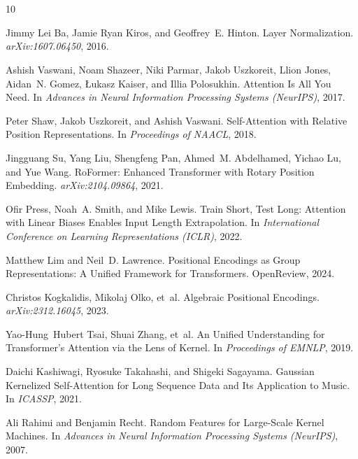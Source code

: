 \documentclass[11pt]{article}
\theoremstyle{definition}
\begin{document}
\section*{}
\begin{thebibliography}{10}

Jimmy Lei Ba, Jamie Ryan Kiros, and Geoffrey~E. Hinton.
\newblock Layer Normalization.
\newblock \emph{arXiv:1607.06450}, 2016.

Ashish Vaswani, Noam Shazeer, Niki Parmar, Jakob Uszkoreit, Llion Jones,
  Aidan~N. Gomez, {\L}ukasz Kaiser, and Illia Polosukhin.
\newblock Attention Is All You Need.
\newblock In \emph{Advances in Neural Information Processing Systems (NeurIPS)},
  2017.

Peter Shaw, Jakob Uszkoreit, and Ashish Vaswani.
\newblock Self-Attention with Relative Position Representations.
\newblock In \emph{Proceedings of NAACL}, 2018.

Jingguang Su, Yang Liu, Shengfeng Pan, Ahmed~M. Abdelhamed, Yichao Lu, and Yue
  Wang.
\newblock RoFormer: Enhanced Transformer with Rotary Position Embedding.
\newblock \emph{arXiv:2104.09864}, 2021.

Ofir Press, Noah~A. Smith, and Mike Lewis.
\newblock Train Short, Test Long: Attention with Linear Biases Enables Input
  Length Extrapolation.
\newblock In \emph{International Conference on Learning Representations
  (ICLR)}, 2022.

Matthew Lim and Neil~D. Lawrence.
\newblock Positional Encodings as Group Representations: A Unified Framework
  for Transformers.
\newblock OpenReview, 2024.

Christos Kogkalidis, Mikolaj Olko, et~al.
\newblock Algebraic Positional Encodings.
\newblock \emph{arXiv:2312.16045}, 2023.

Yao-Hung~Hubert Tsai, Shuai Zhang, et~al.
\newblock An Unified Understanding for Transformer's Attention via the Lens of
  Kernel.
\newblock In \emph{Proceedings of EMNLP}, 2019.

Daichi Kashiwagi, Ryosuke Takahashi, and Shigeki Sagayama.
\newblock Gaussian Kernelized Self-Attention for Long Sequence Data and Its
  Application to Music.
\newblock In \emph{ICASSP}, 2021.

Ali Rahimi and Benjamin Recht.
\newblock Random Features for Large-Scale Kernel Machines.
\newblock In \emph{Advances in Neural Information Processing Systems
  (NeurIPS)}, 2007.


\end{thebibliography}
\end{document}
